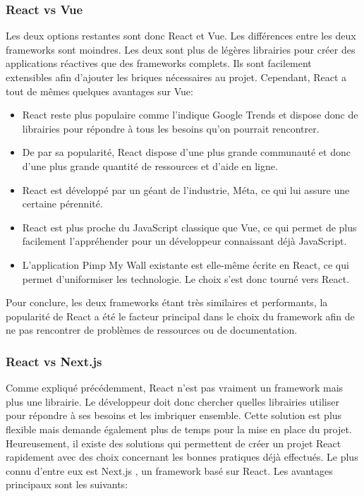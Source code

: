 \subsubsection{React vs Vue}

Les deux options restantes sont donc React et Vue. Les différences entre les deux frameworks sont moindres. Les deux sont plus de légères librairies pour créer des applications réactives que des frameworks complets. Ils sont facilement extensibles afin d'ajouter les briques nécessaires au projet. Cependant, React a tout de mêmes quelques avantages sur Vue:

\begin{itemize}
  \item React reste plus populaire comme l'indique Google Trends \cite{google-trends-js-frameworks} et dispose donc de librairies pour répondre à tous les besoins qu'on pourrait rencontrer.
  \item De par sa popularité, React dispose d'une plus grande communauté et donc d'une plus grande quantité de ressources et d'aide en ligne.
  \item React est développé par un géant de l'industrie, Méta, ce qui lui assure une certaine pérennité.
  \item React est plus proche du JavaScript classique que Vue, ce qui permet de plus facilement l'appréhender pour un développeur connaissant déjà JavaScript.
  \item L'application Pimp My Wall existante est elle-même écrite en React, ce qui permet d'uniformiser les technologie. Le choix s'est donc tourné vers React.
\end{itemize}

Pour conclure, les deux frameworks étant très similaires et performants, la popularité de React a été le facteur principal dans le choix du framework afin de ne pas rencontrer de problèmes de ressources ou de documentation.

\subsubsection{React vs Next.js}

Comme expliqué précédemment, React n'est pas vraiment un framework mais plus une librairie. Le développeur doit donc chercher quelles librairies utiliser pour répondre à ses besoins et les imbriquer ensemble. Cette solution est plus flexible mais demande également plus de temps pour la mise en place du projet. Heureusement, il existe des solutions qui permettent de créer un projet React rapidement avec des choix concernant les bonnes pratiques déjà effectués. Le plus connu d'entre eux est Next.js \cite{nextjs}, un framework basé sur React. Les avantages principaux sont les suivants:

